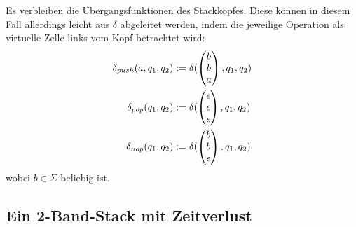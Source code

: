 \documentclass{article}
\begin{document}
Es verbleiben die Übergangsfunktionen des Stackkopfes. Diese können in diesem Fall allerdings leicht aus $\delta$ abgeleitet werden, indem die jeweilige Operation als virtuelle Zelle links vom Kopf betrachtet wird:
\begin{align*}
    \delta_{push}(a, q_1, q_2) &:= \delta(\begin{pmatrix}b\\b\\a\end{pmatrix}, q_1, q_2) \\
    \delta_{pop}(q_1, q_2) &:= \delta(\begin{pmatrix}\epsilon\\\epsilon\\\epsilon\end{pmatrix}, q_1, q_2) \\
    \delta_{nop}(q_1, q_2) &:= \delta(\begin{pmatrix}b\\b\\\epsilon\end{pmatrix}, q_1, q_2) \\
\end{align*}
wobei $b \in \Sigma$ beliebig ist.

\subsection{Ein 2-Band-Stack mit Zeitverlust}
\end{document}
